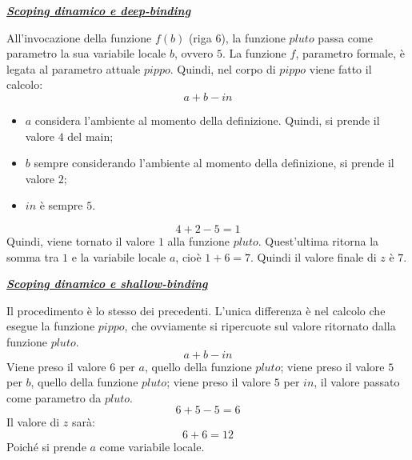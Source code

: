 \documentclass[a4paper]{article}
\begin{document}
	\begin{center}
		\textbf{\emph{\underline{Scoping dinamico e deep-binding}}}
	\end{center}
	
	\noindent
	All'invocazione della funzione $f(b)$ (riga 6), la funzione $pluto$ passa come parametro la sua variabile locale $b$, ovvero $5$. La funzione $f$, parametro formale, è legata al parametro attuale $pippo$. Quindi, nel corpo di $pippo$ viene fatto il calcolo:
	\begin{equation*}
		a+b-in
	\end{equation*}
	\begin{itemize}
		\item $a$ considera l'ambiente al momento della definizione. Quindi, si prende il valore $4$ del main;
		
		\item $b$ sempre considerando l'ambiente al momento della definizione, si prende il valore $2$;
		
		\item $in$ è sempre $5$.
	\end{itemize}
	\begin{equation*}
		4 + 2 - 5 = 1
	\end{equation*}
	Quindi, viene tornato il valore $1$ alla funzione $pluto$. Quest'ultima ritorna la somma tra $1$ e la variabile locale $a$, cioè $1+6=7$. Quindi il valore finale di $z$ è $7$.
	
	\begin{center}
		\textbf{\emph{\underline{Scoping dinamico e shallow-binding}}}
	\end{center}
	
	\noindent
	Il procedimento è lo stesso dei precedenti. L'unica differenza è nel calcolo che esegue la funzione $pippo$, che ovviamente si ripercuote sul valore ritornato dalla funzione $pluto$.
	\begin{equation*}
		a + b - in
	\end{equation*}
	Viene preso il valore $6$ per $a$, quello della funzione $pluto$; viene preso il valore $5$ per $b$, quello della funzione $pluto$; viene preso il valore $5$ per $in$, il valore passato come parametro da $pluto$.
	\begin{equation*}
		6 + 5 - 5 = 6
	\end{equation*}
	Il valore di $z$ sarà:
	\begin{equation*}
		6 + 6 = 12
	\end{equation*}
	Poiché si prende $a$ come variabile locale.\newpage
	
\end{document}
